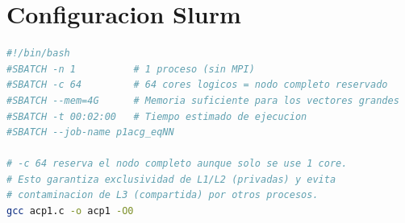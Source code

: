 \documentclass[12pt,a4paper]{article}
\begin{document}
\appendix
\section{Configuracion Slurm}

\begin{lstlisting}[language=bash, caption={Cabecera de los scripts Slurm (identica en las tres variantes)}, label=lst:slurm]
#!/bin/bash
#SBATCH -n 1          # 1 proceso (sin MPI)
#SBATCH -c 64         # 64 cores logicos = nodo completo reservado
#SBATCH --mem=4G      # Memoria suficiente para los vectores grandes
#SBATCH -t 00:02:00   # Tiempo estimado de ejecucion
#SBATCH --job-name p1acg_eqNN

# -c 64 reserva el nodo completo aunque solo se use 1 core.
# Esto garantiza exclusividad de L1/L2 (privadas) y evita
# contaminacion de L3 (compartida) por otros procesos.
gcc acp1.c -o acp1 -O0
\end{lstlisting}
\end{document}
